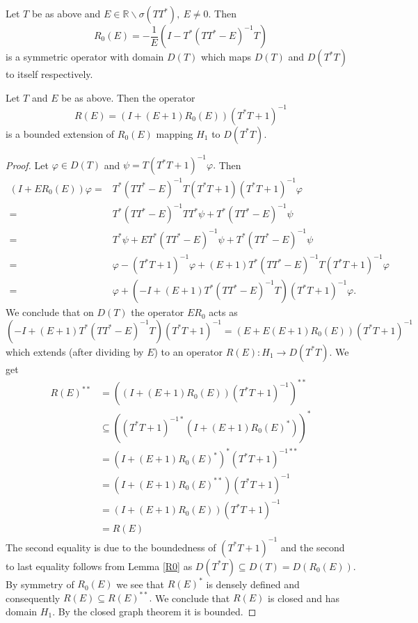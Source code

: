 \documentclass[10pt,a4paper]{amsart}
\begin{document}
\begin{lemma}\label{R0}    
Let $T$ be as above and $E\in\mathbb{R}\backslash\sigma(TT^*),~E\neq 0.$ Then $$R_0(E) = -\frac{1}{E}\left(I-T^*(TT^*-E)^{-1}T\right)$$
    is a symmetric operator with domain $D(T)$ which maps $D(T)$ and $D(T^*T)$ to itself respectively.
\end{lemma}

\begin{lemma}
    Let $T$ and $E$ be as above. Then the operator $$R(E) = (I+(E+1)R_0(E))(T^*T+1)^{-1}$$ is a bounded extension of $R_0(E)$ mapping $H_1$ to $D(T^*T).$
\end{lemma}

\begin{proof}
    Let $\varphi\in D(T)$ and $\psi = T(T^*T+1)^{-1}\varphi.$ Then
    \begin{align*}
        (I+ER_{0}(E))\varphi=&	T^{*}(TT^{*}-E)^{-1}T(T^{*} T+1) (T^{*}T+1)^{-1}\varphi\\
	    =&	T^{*}(TT^{*}-E)^{-1}TT^{*}\psi+ T^{*}(TT^{*}-E)^{-1}\psi\\
	    =&T^{*}\psi +ET^{*}(TT^{*}-E)^{-1}\psi+ T^{*}(TT^{*}-E)^{-1}\psi\\
		=&\varphi - (T^{*}T+1)^{-1}\varphi +(E+1)T^{*}(TT^{*}-E)^{-1}T (T^{*}T+1)^{-1}\varphi\\
		=&\varphi + (-I +(E+1)T^{*}(TT^{*}-E)^{-1}T) (T^{*}T+1)^{-1}\varphi.
    \end{align*}
    We conclude that on $D(T)$ the operator $ER_0$ acts as 
    $$(-I +(E+1)T^{*}(TT^{*}-E)^{-1}T) (T^{*}T+1)^{-1} = (E+E(E+1)R_0(E))(T^{*}T+1)^{-1}$$
    which extends (after dividing by $E$) to an operator $R(E):H_1\rightarrow D(T^*T).$ We get
    \begin{align*}
        R(E)^{**} &= \left((I+(E+1)R_0(E))(T^*T+1)^{-1}\right)^{**}\\
        &\subseteq\left((T^*T+1)^{-1*}(I+(E+1)R_0(E)^*)\right)^*\\
        & = (I+(E+1)R_0(E)^*)^*(T^*T+1)^{-1**}\\
        & = (I+(E+1)R_0(E)^{**})(T^*T+1)^{-1}\\
        & = (I+(E+1)R_0(E))(T^*T+1)^{-1}\\
        &= R(E) 
    \end{align*}
    The second equality is due to the boundedness of $(T^*T+1)^{-1}$ and the second to last equality follows from Lemma \ref{R0} as $D(T^*T)\subseteq D(T) = D(R_0(E)).$ By symmetry of $R_0(E)$ we see that $R(E)^*$ is densely defined and consequently $R(E)\subseteq R(E)^{**}.$
    We conclude that $R(E)$ is closed and has domain $H_1.$ By the closed graph theorem it is bounded.
\end{proof}
\end{document}
